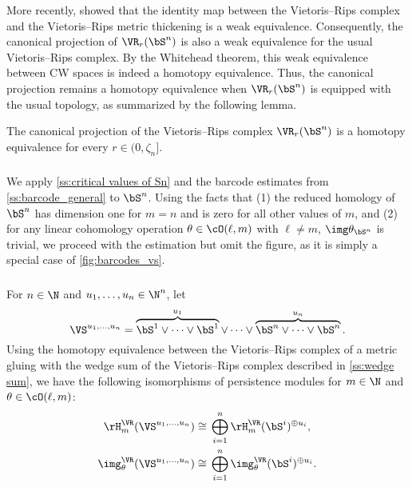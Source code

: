 More recently, \cite{gillespie2024vietoris} showed that the identity map between the Vietoris--Rips complex and the Vietoris--Rips metric thickening is a weak equivalence.
Consequently, the canonical projection of \(\VR_r(\bS^n)\) is also a weak equivalence for the usual Vietoris--Rips complex. By the Whitehead theorem, this weak equivalence between CW spaces is indeed a homotopy equivalence.
Thus, the canonical projection remains a homotopy equivalence when \(\VR_r(\bS^n)\) is equipped with the usual topology, as summarized by the following lemma.

\lemma
The canonical projection of the Vietoris--Rips complex \(\VR_r(\bS^n)\) is a homotopy equivalence for every $r \in (0, \zeta_n]$.

\subsubsection{}\label{ss:barcode_Sn}

We apply \cref{ss:critical values of Sn} and the barcode estimates from \cref{ss:barcode_general} to \(\bS^n\).
Using the facts that (1) the reduced homology of \(\bS^n\) has dimension one for \(m = n\) and is zero for all other values of \(m\), and (2) for any linear cohomology operation \(\theta \in \cO(\ell, m)\) with \(\ell \neq m\), \(\img \theta_{\bS^n}\) is trivial, we proceed with the estimation but omit the figure, as it is simply a special case of \cref{fig:barcodes_vs}.

\subsubsection{}\label{ss:barcodes_VS}

For $n \in \N$ and $u_1, \dots, u_n \in \N^n$, let
\[
\VS^{u_1,\dots,u_n} =
\overbrace{\bS^1\vee\dots\vee\bS^1}^{u_1} \vee\dots\vee \overbrace{\bS^n\vee\dots\vee\bS^n}^{u_n}.
\]
Using the homotopy equivalence between the Vietoris--Rips complex of a metric gluing with the wedge sum of the Vietoris--Rips complex described in \cref{ss:wedge sum}, we have the following isomorphisms of persistence modules for \(m \in \N\) and \(\theta \in \cO(\ell,m)\):
\[
\begin{split}
	\rH_m^\VR(\VS^{u_1,\dots,u_n}) &\cong \, \bigoplus_{i=1}^n \rH_m^\VR(\bS^i)^{\oplus u_i}, \\
	\img_\theta^\VR(\VS^{u_1,\dots,u_n}) &\cong \, \bigoplus_{i=1}^n \img_\theta^\VR(\bS^i)^{\oplus u_i}.
\end{split}
\]

